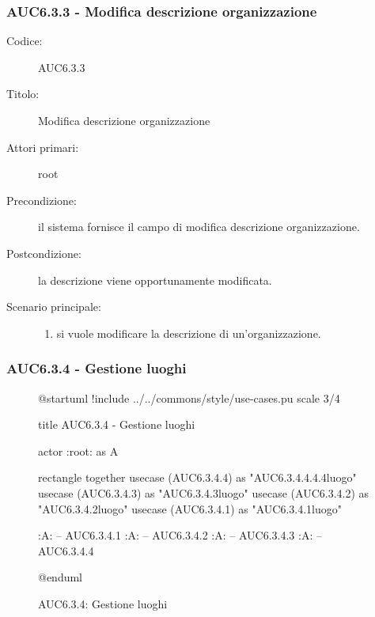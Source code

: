 \documentclass[casi-duso]{subfiles}
\begin{document}
\subsubsection{AUC6.3.3 - Modifica descrizione organizzazione}%
\label{subsub:AUC6.3.3}
\begin{description}
  \item[Codice:] AUC6.3.3
  \item[Titolo:] Modifica descrizione organizzazione
  \item[Attori primari:] root
  \item[Precondizione:] il sistema fornisce il campo di modifica descrizione organizzazione.
  \item[Postcondizione:] la descrizione viene opportunamente modificata.
  \item[Scenario principale:]
  \begin{enumerate}
    \item si vuole modificare la descrizione di un'organizzazione.
  \end{enumerate}
\end{description}

\subsubsection{AUC6.3.4 - Gestione luoghi}%
\label{subsub:AUC6.3.4}

\begin{figure}[h!] 
  \centering 
  \begin{plantuml}
  @startuml
  !include ../../commons/style/use-cases.pu
  scale 3/4

  title AUC6.3.4 - Gestione luoghi

  actor :root: as A

  rectangle {
    together {
      usecase (AUC6.3.4.4) as "AUC6.3.4.4.4.4\nSeleziona luogo"
      usecase (AUC6.3.4.3) as "AUC6.3.4.3\nModifica luogo"
      usecase (AUC6.3.4.2) as "AUC6.3.4.2\nEliminazione luogo"
      usecase (AUC6.3.4.1) as "AUC6.3.4.1\nAggiungi luogo"
    }
  }

  :A: -- AUC6.3.4.1
  :A: -- AUC6.3.4.2
  :A: -- AUC6.3.4.3
  :A: -- AUC6.3.4.4

  @enduml
  \end{plantuml} 
  \caption{AUC6.3.4: Gestione luoghi} 
  \label{fig:auc6_3_4} 
\end{figure}
\end{document}
